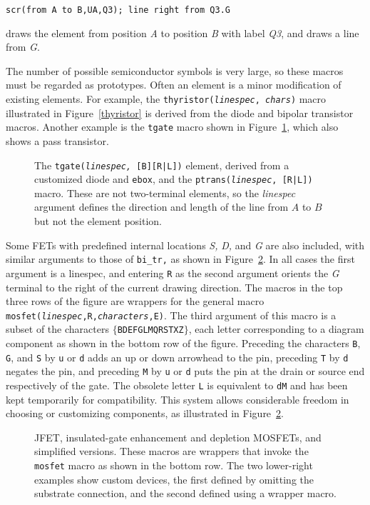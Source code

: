 {\tt scr(from A to B,UA,Q3); line right from Q3.G}

\noindent
draws the element from position {\sl A} to position {\sl B} with label
{\sl Q3}, and draws a line from {\sl G}.

The number of possible semiconductor symbols is very
large, so these macros must be regarded as prototypes.
Often an element is a minor modification of existing elements.  For example,
the {\tt thyristor({\sl linespec}, {\sl chars})} macro illustrated in
Figure~\ref{thyristor} is derived from the diode and bipolar transistor macros.
Another example is the {\tt tgate} macro shown in Figure~\ref{Tgate}, which
also shows a pass transistor.
\enlargethispage{\baselineskip}%
\begin{figure}[h!t]
   
   \caption{The {\tt tgate({\sl linespec,} [B][R|L])} element, derived from
     a customized diode and {\tt ebox}, and the
     {\tt ptrans({\sl linespec}, [R|L])} macro.
     These are not two-terminal elements, so the {\sl linespec} argument
     defines the direction and length of the line from $A$ to $B$ but not
     the element position.}
   \label{Tgate}
   \end{figure}

Some FETs with predefined internal locations {\sl S,} {\sl D,} and {\sl G} are
also included, with similar arguments to those of {\tt bi\_tr,} as shown in
Figure~\ref{fet}.
In all cases the first argument is a linespec, and entering
{\tt R} as the second argument orients the {\sl G} terminal to the right of the
current drawing direction.
The macros in the top three rows of the figure are wrappers for the
general macro {\tt mosfet({\sl linespec},R,{\sl characters},E)}.
The third argument of this macro is a subset of the characters
$\{${\tt BDEFGLMQRSTXZ}$\}$, each letter corresponding to
a diagram component as shown in the bottom row of the figure. 
Preceding the characters {\tt B}, {\tt G}, and {\tt S} by {\tt u} or {\tt d}
adds an up or down arrowhead to the pin, preceding {\tt T} by {\tt d}
negates the pin, and preceding {\tt M} by {\tt u} or {\tt d} puts the pin
at the drain or source end respectively of the gate.
The obsolete letter {\tt L} is equivalent to {\tt dM} and has been kept
temporarily for compatibility.
This system allows considerable freedom in choosing or customizing components,
as illustrated in Figure~\ref{fet}.
\begin{figure}[ht]
   
   \caption{JFET, insulated-gate enhancement and depletion MOSFETs,
     and simplified versions.
     These macros are wrappers that invoke the {\tt mosfet}
     macro as shown in the bottom row.
     The two lower-right examples show custom devices, the first
     defined by omitting the substrate connection, and the second
     defined using a wrapper macro.}
   \label{fet}
   \end{figure}

